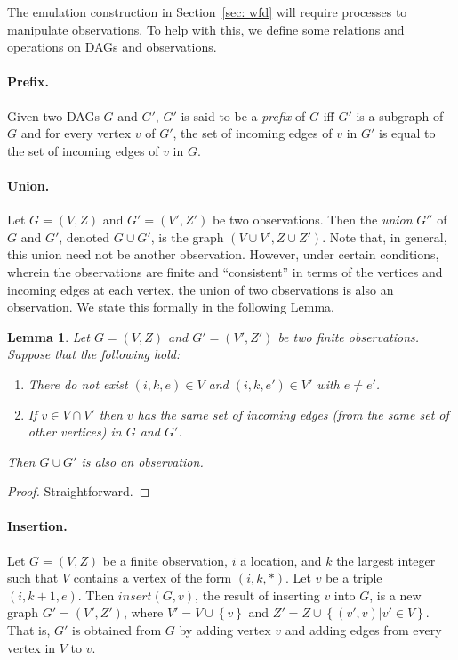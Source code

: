 \documentclass[11pt]{article}
\numberwithin{theorem}{section}
\newtheorem{lemma}[theorem]{Lemma}
\newcommand{\set}[1]{\left\{#1\right\}}
\begin{document}
The emulation construction in Section~\ref{sec: wfd} will require
processes to manipulate observations.  To help with this, we define
some relations and operations on DAGs and observations. 

\paragraph{Prefix.}
Given two DAGs $G$ and $G'$, $G'$ is said to be a
\emph{prefix} of $G$ iff $G'$ is a subgraph of $G$ and for every
vertex $v$ of $G'$, the set of incoming edges of $v$ in $G'$ is equal
to the set of incoming edges of $v$ in $G$.

\paragraph{Union.}
Let $G = (V,Z)$ and $G' = (V',Z')$ be two observations. 
Then the \emph{union} $G''$ of $G$ and $G'$, denoted $G \cup G'$, is
the graph $(V \cup V', Z \cup Z')$.
Note that, in general, this union need not be another observation.
However, under certain conditions, wherein the observations are finite and ``consistent'' in terms of the vertices and incoming edges at each vertex, the union of two observations is also an observation. We state this formally in the following Lemma.

\begin{lemma}
\label{prop:obs:union}
Let $G = (V,Z)$ and $G' = (V',Z')$ be two finite observations. 
Suppose that the following hold:
\begin{enumerate}
\item
There do not exist $(i,k,e) \in V$ and $(i,k,e') \in V'$
with $e \neq e'$.  
\item
If $v \in V \cap V'$ then $v$ has the same set of incoming edges (from
the same set of other vertices) in $G$ and $G'$.
\end{enumerate}
Then $G \cup G'$ is also an observation. 
\end{lemma}

\begin{proof}
Straightforward.
\end{proof}





\paragraph{Insertion.}
Let $G = (V,Z)$ be a finite observation, $i$ a location, and $k$ the
largest integer such that $V$ contains a vertex of the form $(i,k,*)$.
Let $v$ be a triple $(i,k+1,e)$.
Then $insert(G,v)$, the result of inserting $v$ into $G$, is a new graph 
$G' = (V',Z')$, where $V' = V \cup \set{v}$ and 
$Z' = Z \cup \set{(v',v) | v' \in V}$. 
That is, $G'$ is obtained from $G$ by adding vertex $v$ and adding
edges from every vertex in $V$ to $v$.
\end{document}
